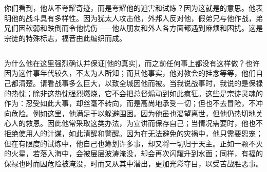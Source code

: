 你们看到，他从不夸耀奇迹，而是夸耀他的迫害和试炼？因为这就是的意思。他表明他的战斗具有多样性。因为犹太人攻击他，外邦人反对他，假弟兄与他作战，弟兄们因软弱和跌倒而令他忧伤——他从朋友和外人各方面都遇到麻烦和困扰。这是宗徒的特殊标志，福音由此编织而成。\par


\subsection{}

\par

为什么他在这里强烈确认并保证[他的真实]，而之前任何事上都没有这样做？也许因为这件事年代较久，不太为人所知；而其他事实，他对教会的挂念等等，他们自己都清楚。请看战事多么巨大，以致全城因他而被。当我说战事时，我说的是保禄的热忱；除非这热忱强烈燃烧，它不会把总督煽动到如此疯狂。这些是宗徒灵魂的作为：忍受如此大事，却丝毫不转向，而是高尚地承受一切；但也不去冒险，不冲向危险。例如这里，他满足于以躲避围困。因为他虽也渴望离世，但他仍热切地关心人的救恩。因此他常采取这类办法，为宣讲而保存自己；当情况需要时，他也不拒绝使用人的计谋，如此清醒和警醒。因为在无法避免的灾祸中，他只需要恩宠；但在有限度的试炼中，他自己也筹划许多事，却又将一切归于天主。正如一颗不灭的火星，若落入海中，会被层层波涛淹没，却会再次闪耀升到水面；同样，有福的保禄也时而因危险被淹没，时而又从其中潜出，更加光彩夺目，以受苦战胜恶事。\par

